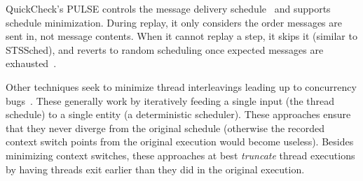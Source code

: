 
QuickCheck's PULSE controls the message delivery
schedule~\cite{claessen2009finding} and supports schedule minimization. During replay, it only considers the
order messages are sent in, not message contents.
When it cannot replay a step, it skips it (similar to
STSSched), and reverts to random scheduling once expected messages
are exhausted~\cite{hughes_email}.


 Other techniques seek to minimize thread
interleavings leading up to concurrency
bugs~\cite{choi2002isolating,jalbert2010trace,huang2011efficient,el2014efficient}.
These generally work by iteratively feeding a single input (the thread
schedule) to a single entity (a deterministic scheduler). These approaches
ensure that they never diverge from the
original schedule (otherwise the recorded context switch points from the
original execution would become useless). Besides minimizing context
switches, these approaches at
best {\em truncate} thread executions by having threads exit earlier than they did in the original
execution.

%
%


